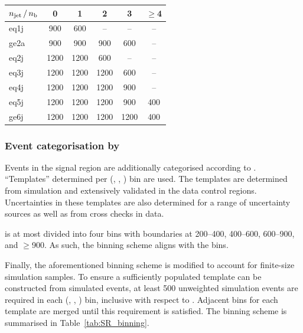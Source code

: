 \begin{table}[!h]
  \label{tab:sr-binning}
  \centering
  \begin{tabular}{ lccccc }
    \hline
    $n_{\text{jet}}\, / \,n_{\text{b}}$ & 0    & 1    & 2    & 3    & $\geq$4 \\
    \hline
    eq1j              & 900  & 600  & --   & --   & --      \\ 
    ge2a              & 900  & 900  & 900  & 600  & --      \\ 
    eq2j              & 1200 & 1200 & 600  & --   & --      \\ 
    eq3j              & 1200 & 1200 & 1200 & 600  & --      \\ 
    eq4j              & 1200 & 1200 & 1200 & 900  & --      \\ 
    eq5j              & 1200 & 1200 & 1200 & 900  & 400     \\ 
    ge6j              & 1200 & 1200 & 1200 & 1200 & 400     \\ 
    \hline
  \end{tabular}
\end{table}

\subsubsection{Event categorisation by \texorpdfstring{\HTmiss}{HTmiss}}
\label{sec:htmiss-categorisation}

Events in the signal region are additionally categorised according to
\HTmiss. ``Templates'' determined per (\njet, \scalht, \nb) bin are
used. The templates are determined from simulation and extensively
validated in the data control regions. Uncertainties in these
templates are also determined for a range of uncertainty sources as
well as from cross checks in data.

\HTmiss is at most divided into four bins with boundaries at 200--400,
400--600, 600--900, and $\ge$900\GeV.  As such, the \HTmiss binning scheme
aligns with the \scalht bins.

Finally, the aforementioned \HTmiss binning scheme is modified to
account for finite-size simulation samples. To ensure a sufficiently
populated \HTmiss template can be constructed from simulated events,
at least 500 unweighted simulation events are required in each (\njet,
\scalht, \MHT) bin, inclusive with respect to \nb. Adjacent \HTmiss
bins for each template are merged until this requirement is
satisfied. The \HTmiss binning scheme is summarised in
Table~\ref{tab:SR_binning}. 

